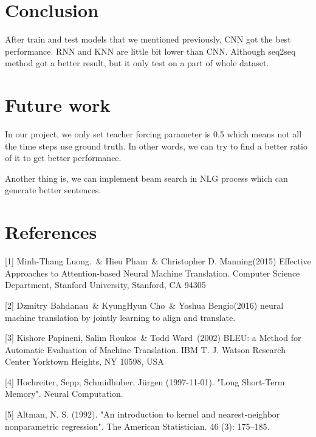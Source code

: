 \documentclass{article}
\begin{document}
\section{Conclusion}
After train and test models that we mentioned previously, CNN got the best performance. RNN and KNN are little bit lower than CNN. Although seq2seq method got a better result, but it only test on a part of whole dataset.

\section{Future work}
In our project, we only set teacher forcing parameter is 0.5 which means not all the time steps use ground truth. In other words, we can try to find a better ratio of it to get better performance.

Another thing is, we can implement beam search in NLG process which can generate better sentences.
\section*{References}

[1] Minh-Thang Luong.\ \& Hieu Pham\ \& Christopher D. Manning(2015) Effective Approaches to Attention-based Neural Machine Translation. Computer Science Department, Stanford University, Stanford, CA 94305

[2] Dzmitry Bahdanau\ \& KyungHyun Cho\ \& Yoshua Bengio(2016) neural machine translation by jointly learning to align and translate.

[3] Kishore Papineni, Salim Roukos\ \& Todd Ward\ (2002) BLEU: a Method for Automatic Evaluation of Machine Translation. IBM T. J. Watson Research Center Yorktown Heights, NY 10598, USA

[4] Hochreiter, Sepp; Schmidhuber, Jürgen (1997-11-01). "Long Short-Term Memory". Neural Computation.

[5] Altman, N. S. (1992). "An introduction to kernel and nearest-neighbor nonparametric regression". The American Statistician. 46 (3): 175–185. 
\end{document}
